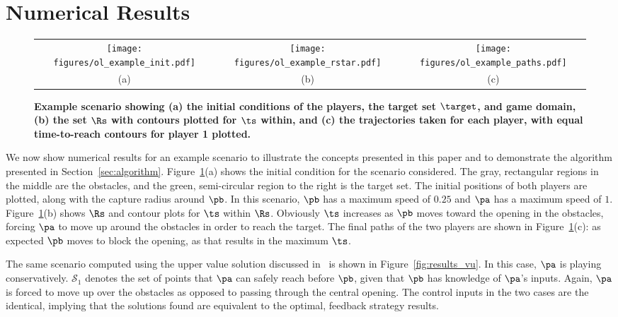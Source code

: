 \section{Numerical Results}
\label{sec:results}

\begin{figure*}[t]
	\centering
	\begin{tabular}{ccc}
	         \texttt{[image: figures/ol\_example\_init.pdf]} &
		\texttt{[image: figures/ol\_example\_rstar.pdf]}  &
		\texttt{[image: figures/ol\_example\_paths.pdf]}  \\ 
		(a) & (b) & (c)
	\end{tabular} 
	\caption{\textbf{Example scenario showing (a) the initial conditions of the players, the target set $\target$, and game domain, (b) the set $\Rs$ with contours plotted for $\ts$ within, and (c) the trajectories taken for each player, with equal time-to-reach contours for player 1 plotted. }}
	\label{fig:results_ol}
\end{figure*} 

We now show numerical results for an example scenario to illustrate the concepts presented in this paper and to demonstrate the algorithm presented in Section~\ref{sec:algorithm}.
Figure~\ref{fig:results_ol}(a) shows the initial condition for the scenario considered.
The gray, rectangular regions in the middle are the obstacles, and the green, semi-circular region to the right is the target set.
The initial positions of both players are plotted, along with the capture radius around $\pb$.
In this scenario, $\pb$ has a maximum speed of $0.25$ and $\pa$ has a maximum speed of $1$.
Figure~\ref{fig:results_ol}(b) shows $\Rs$ and contour plots for $\ts$ within $\Rs$. 
Obviously $\ts$ increases as $\pb$ moves toward the opening in the obstacles, forcing $\pa$ to move up around the obstacles in order to reach the target.
The final paths of the two players are shown in Figure~\ref{fig:results_ol}(c): as expected $\pb$ moves to block the opening, as that results in the maximum $\ts$.

The same scenario computed using the upper value solution discussed in~\cite{OL_ICRA2012} is shown in Figure~\ref{fig:results_vu}.
In this case, $\pa$ is playing conservatively.
$\mathcal{S}_1$ denotes the set of points that $\pa$ can safely reach before $\pb$, given that $\pb$ has knowledge of $\pa$'s inputs.
Again, $\pa$ is forced to move up over the obstacles as opposed to passing through the central opening.
The control inputs in the two cases are the identical, implying that the solutions found are equivalent to the optimal, feedback strategy results.

